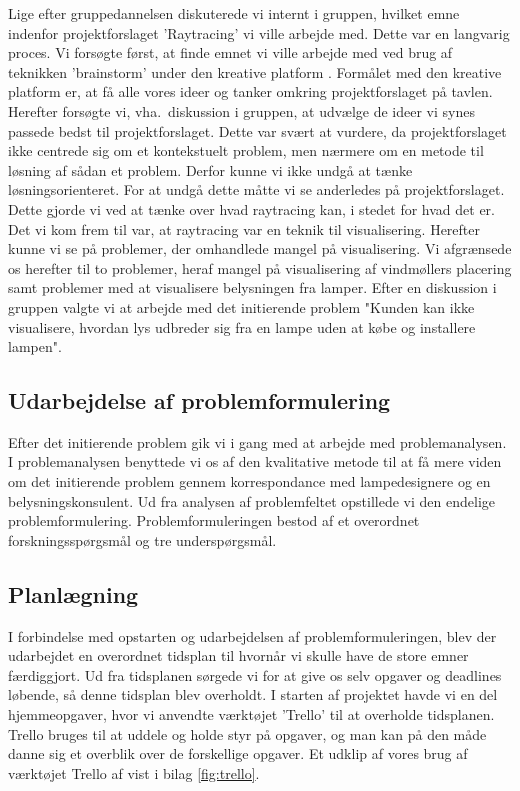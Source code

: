 \documentclass[oneside,a4paper,titlepage]{article}
\begin{document}
Lige efter gruppedannelsen diskuterede vi internt i gruppen, hvilket emne indenfor projektforslaget 'Raytracing' vi ville arbejde med. Dette var en langvarig proces. Vi forsøgte først, at finde emnet vi ville arbejde med ved brug af teknikken 'brainstorm' under den kreative platform \cite{kreativ_platform}. Formålet med den kreative platform er, at få alle vores ideer og tanker omkring projektforslaget på tavlen. Herefter forsøgte vi, vha.\ diskussion i gruppen, at udvælge de ideer vi synes passede bedst til projektforslaget. Dette var svært at vurdere, da projektforslaget ikke centrede sig om et kontekstuelt problem, men nærmere om en metode til løsning af sådan et problem. Derfor kunne vi ikke undgå at tænke løsningsorienteret. For at undgå dette måtte vi se anderledes på projektforslaget. Dette gjorde vi ved at tænke over hvad raytracing kan, i stedet for hvad det er. Det vi kom frem til var, at raytracing var en teknik til visualisering. Herefter kunne vi se på problemer, der omhandlede mangel på visualisering. Vi afgrænsede os herefter til to problemer, heraf mangel på visualisering af vindmøllers placering samt problemer med at visualisere belysningen fra lamper. Efter en diskussion i gruppen valgte vi at arbejde med det initierende problem "Kunden kan ikke visualisere, hvordan lys udbreder sig fra en lampe uden at købe og installere lampen". 

\subsection{Udarbejdelse af problemformulering}
Efter det initierende problem gik vi i gang med at arbejde med problemanalysen. I problemanalysen benyttede vi os af den kvalitative metode \cite{kvalitativ_metode} til at få mere viden om det initierende problem gennem korrespondance med lampedesignere og en belysningskonsulent. Ud fra analysen af problemfeltet opstillede vi den endelige problemformulering. Problemformuleringen bestod af et overordnet forskningsspørgsmål og tre underspørgsmål.

\subsection{Planlægning}
I forbindelse med opstarten og udarbejdelsen af problemformuleringen, blev der udarbejdet en overordnet tidsplan til hvornår vi skulle have de store emner færdiggjort. Ud fra tidsplanen sørgede vi for at give os selv opgaver og deadlines løbende, så denne tidsplan blev overholdt. I starten af projektet havde vi en del hjemmeopgaver, hvor vi anvendte værktøjet 'Trello' til at overholde tidsplanen. Trello bruges til at uddele og holde styr på opgaver, og man kan på den måde danne sig et overblik over de forskellige opgaver. Et udklip af vores brug af værktøjet Trello af vist i bilag \ref{fig:trello}. 
\newline
\end{document}
